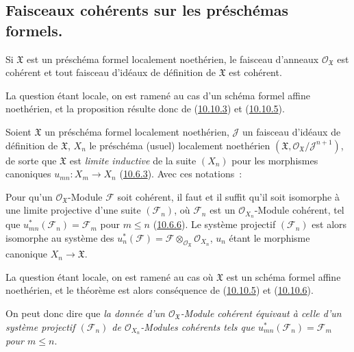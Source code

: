 \subsection{Faisceaux cohérents sur les préschémas formels.}
\label{subsection:I.10.11-fr}

\begin{proposition}[10.11.1]
\label{I.10.11.1-fr}
Si $\mathfrak{X}$ est un préschéma formel localement noethérien, le
faisceau d'anneaux $\mathscr{O}_{\mathfrak{X}}$ est cohérent et tout
faisceau d'idéaux de définition de $\mathfrak{X}$ est cohérent.
\end{proposition}

La question étant locale, on est ramené au cas d'un schéma formel affine
noethérien, et la proposition résulte donc de
(\hyperref[I.10.10.3-fr]{10.10.3}) et
(\hyperref[I.10.10.5-fr]{10.10.5}).

\begin{env}[10.11.2]
\label{I.10.11.2-fr}
Soient $\mathfrak{X}$ un préschéma formel localement noethérien,
$\mathscr{J}$ un faisceau d'idéaux de définition de $\mathfrak{X}$,
$X_n$ le préschéma (usuel) localement noethérien
$(\mathfrak{X},\mathscr{O}_{\mathfrak{X}}/\mathscr{J}^{n+1})$, de
sorte que $\mathfrak{X}$ est \emph{limite inductive} de la suite $(X_n)$ pour
les morphismes canoniques $u_{mn}:X_m\to X_n$
(\hyperref[I.10.6.3-fr]{10.6.3}). Avec ces notations~:
\end{env}

\begin{theorem}[10.11.3]
\label{I.10.11.3-fr}
Pour qu'un $\mathscr{O}_{\mathfrak{X}}$-Module $\mathscr{F}$ soit
cohérent, il faut et il suffit qu'il soit isomorphe à une limite
projective d'une suite $(\mathscr{F}_n)$, où $\mathscr{F}_n$ est un
$\mathscr{O}_{X_n}$-Module cohérent, tel que
$u_{mn}^*(\mathscr{F}_n)=\mathscr{F}_m$ pour $m\leq n$
\textup{(\hyperref[I.10.6.6-fr]{10.6.6})}. Le système projectif
$(\mathscr{F}_n)$ est alors isomorphe au système des
$u_n^*(\mathscr{F})=\mathscr{F}
\otimes_{\mathscr{O}_{\mathfrak{X}}}\mathscr{O}_{X_n}$, $u_n$ étant
le morphisme canonique $X_n\to\mathfrak{X}$.
\end{theorem}

La question étant locale, on est ramené au cas où $\mathfrak{X}$ est
un schéma formel affine noethérien, et le théorème est alors conséquence
de (\hyperref[I.10.10.5-fr]{10.10.5}) et
(\hyperref[I.10.10.6-fr]{10.10.6}).

On peut donc dire que \emph{la donnée d'un
$\mathscr{O}_{\mathfrak{X}}$-Module cohérent équivaut à celle d'un
système projectif $(\mathscr{F}_n)$ de
$\mathscr{O}_{X_n}$-Modules cohérents tels que
$u_{mn}^*(\mathscr{F}_n)=\mathscr{F}_m$ pour $m\leq n$}.

